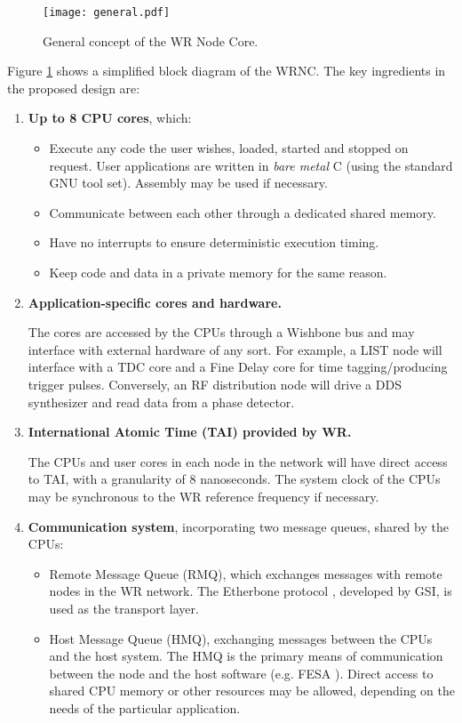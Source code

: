 \documentclass{article}
\begin{document}
\begin{figure}[htb]
\centering
\texttt{[image: general.pdf]}
\caption{General concept of the WR Node Core.}
\label{fig:general_concept}
\end{figure}

Figure \ref{fig:general_concept} shows a simplified block diagram of the WRNC. 
The key ingredients in the proposed design are:

\begin{enumerate}
   \item \textbf{Up to 8 CPU cores}, which:

       \begin{itemize}
       \item Execute any code the user wishes, loaded, started and stopped on request. User applications are written
         in \textit{bare metal} C (using the standard GNU tool set). Assembly may be used if necessary.
       \item Communicate between each other through a dedicated shared memory.
       \item Have no interrupts to ensure deterministic execution timing.
       \item Keep code and data in a private memory for the same reason.
       \end{itemize}
     \item \textbf{Application-specific cores and hardware.}

     The cores are accessed by the CPUs through a Wishbone bus and may
     interface with external hardware of any sort. For example, a LIST 
     node will interface with a TDC core and a Fine Delay core 
     for time tagging/producing trigger pulses. Conversely, an RF distribution node will drive a DDS 
     synthesizer and read data from a phase detector.
   \item \textbf{International Atomic Time (TAI) provided by WR.}

     The CPUs and user cores in each node in the network will have direct access to TAI, with
     a granularity of 8 nanoseconds. The system clock of the CPUs
     may be synchronous to the WR reference frequency if necessary.

   \item \textbf{Communication system}, incorporating two message queues, shared by the CPUs:
     \begin{itemize}
     \item Remote Message Queue (RMQ), which exchanges messages with remote nodes 
       in the WR network. The Etherbone protocol \cite{ebone}, developed by GSI, is used as the transport layer.
     \item Host Message Queue (HMQ), exchanging messages between the CPUs and 
       the host system. The HMQ is the primary means of communication between the 
       node and the host software (e.g. FESA \cite{fesa}). Direct access 
       to shared CPU memory or other resources may be allowed, depending on the needs of the particular application.
     \end{itemize}
\end{enumerate}
\newpage
\end{document}
